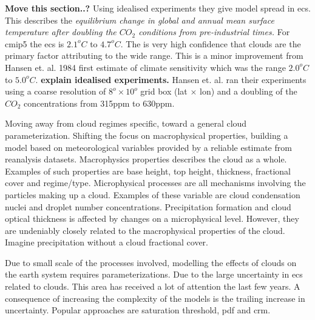 \textbf{Move this section..?}
Using idealised experiments they give model spread in \acrfull{ecs}. This describes the \textit{equilibrium change in global and annual mean surface temperature after doubling the $CO_2$ conditions from pre-industrial times.} For \acrshort{cmip5} the \acrshort{ecs} is $2.1^oC$ to $4.7^oC$. The is very high confidence that clouds are the primary factor attributing to the wide range. This is a minor improvement from Hansen et. al. 1984 first estimate of climate sensitivity which was the range $2.0^oC$ to $5.0^oC$. \textbf{explain idealised experiments.} Hansen et. al. ran their experiments using a coarse resolution of $8^o \times 10^o$ grid box (lat $\times$ lon) and a doubling of the $CO_2$ concentrations from 315ppm to 630ppm. 

Moving away from cloud regimes specific, toward a general cloud parameterization. Shifting the focus on macrophysical properties, building a model based on meteorological variables provided by a reliable estimate from reanalysis datasets. Macrophysics properties describes the cloud as a whole. Examples of such properties are base height, top height, thickness, fractional cover and regime/type. Microphysical processes are all mechanisms involving the particles making up a cloud. Examples of these variable are cloud condensation nuclei and droplet number concentrations. 
Precipitation formation and cloud optical thickness is affected by changes on a microphysical level. However, they are undeniably closely related to the macrophysical properties of the cloud. Imagine precipitation without a cloud fractional cover. 

Due to small scale of the processes involved, modelling the effects of clouds on the earth system requires parameterizations. 
Due to the large uncertainty in \acrfull{ecs} related to clouds. This area has received a lot of attention the last few years. A consequence of increasing the complexity of the models is the trailing increase in uncertainty. Popular approaches are saturation threshold, \acrfull{pdf} and \acrfull{crm}. 


